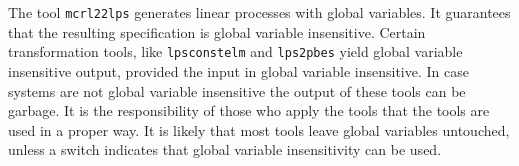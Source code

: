 \documentclass{article}
\begin{document}
The tool {\tt mcrl22lps} generates linear processes with global variables. It guarantees
that the resulting specification is global variable insensitive. Certain transformation
tools, like {\tt lpsconstelm} and {\tt lps2pbes} yield global variable insensitive output, 
provided the input in global variable insensitive. In case systems are not global variable 
insensitive the output of these tools can be garbage. It is the responsibility of those who
apply the tools that the tools are used in a proper way. It is likely that most tools
leave global variables untouched, unless a switch indicates that global variable 
insensitivity can be used.
\end{document}

